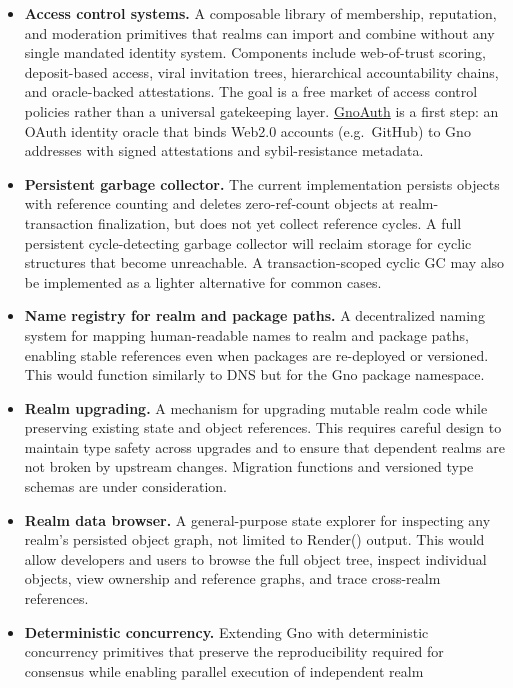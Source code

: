 \documentclass[12pt,a4paper]{article}
\begin{document}
\begin{itemize}
\item
  \textbf{Access control systems.} A composable library of membership,
  reputation, and moderation primitives that realms can import and
  combine without any single mandated identity system. Components
  include web-of-trust scoring, deposit-based access, viral invitation
  trees, hierarchical accountability chains, and oracle-backed
  attestations. The goal is a free market of access control policies
  rather than a universal gatekeeping layer.
  \href{https://github.com/jaekwon/gnoauth}{GnoAuth} is a first step: an
  OAuth identity oracle that binds Web2.0 accounts (e.g.~GitHub) to Gno
  addresses with signed attestations and sybil-resistance metadata.
\item
  \textbf{Persistent garbage collector.} The current implementation
  persists objects with reference counting and deletes zero-ref-count
  objects at realm-transaction finalization, but does not yet collect
  reference cycles. A full persistent cycle-detecting garbage collector
  will reclaim storage for cyclic structures that become unreachable. A
  transaction-scoped cyclic GC may also be implemented as a lighter
  alternative for common cases.
\item
  \textbf{Name registry for realm and package paths.} A decentralized
  naming system for mapping human-readable names to realm and package
  paths, enabling stable references even when packages are re-deployed
  or versioned. This would function similarly to DNS but for the Gno
  package namespace.
\item
  \textbf{Realm upgrading.} A mechanism for upgrading mutable realm code
  while preserving existing state and object references. This requires
  careful design to maintain type safety across upgrades and to ensure
  that dependent realms are not broken by upstream changes. Migration
  functions and versioned type schemas are under consideration.
\item
  \textbf{Realm data browser.} A general-purpose state explorer for
  inspecting any realm's persisted object graph, not limited to Render()
  output. This would allow developers and users to browse the full
  object tree, inspect individual objects, view ownership and reference
  graphs, and trace cross-realm references.
\item
  \textbf{Deterministic concurrency.} Extending Gno with deterministic
  concurrency primitives that preserve the reproducibility required for
  consensus while enabling parallel execution of independent realm

\end{itemize}
\end{document}
